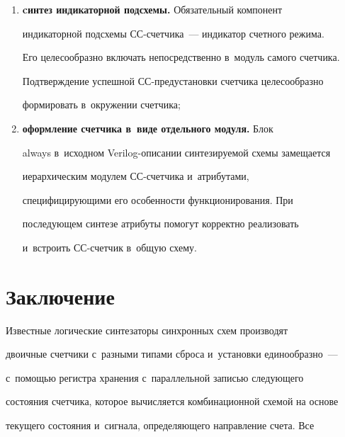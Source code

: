 \begin{enumerate}[(1)]
описывает сум\-ми\-ру\-ющий счетчик, пе\-ре\-клю\-ча\-ющий\-ся по переднему 

фронту сигнала~Т и~об\-ну\-ля\-ющий\-ся по сигналу $\mathrm{res}=1$,  

в~СС-ва\-ри\-ан\-те он реализуется на счетном триггере~С1С из 

биб\-лио\-те\-ки~[21], к~входу сброса которого подключается инверсия 

сигнала res;

\item \textbf{cинтез индикаторной подсхемы.} Обязательный компонент 

индикаторной подсхемы СС-счет\-чи\-ка~--- индикатор счетного режима. 

Его целесообразно включать непосредственно в~модуль самого счетчика. 

Под\-тверж\-де\-ние успешной СС-предуста\-нов\-ки счетчика целесообразно 

формировать в~окру\-же\-нии счетчика;

\item \textbf{оформление счетчика в~виде отдельного модуля.} Блок 

always в~исходном Verilog-опи\-са\-нии син\-те\-зи\-ру\-емой схемы замещается 

иерархическим модулем СС-счет\-чи\-ка и~атрибутами, 

спе\-ци\-фи\-ци\-ру\-ющи\-ми его особенности функционирования. При 

по\-сле\-ду\-ющем синтезе атрибуты помогут корректно реализовать 

и~встроить СС-счет\-чик в~общую схему.

\end{enumerate}



\section{Заключение}

  

  Известные логические синтезаторы синхронных схем производят 

двоичные счетчики с~разными типами сброса и~установки единообразно~--- 

с~по\-мощью ре\-гист\-ра хранения с~параллельной записью следующего 

со\-сто\-яния счетчика, которое вы\-чис\-ля\-ет\-ся комбинационной схемой на основе 

текущего со\-сто\-яния и~сигнала, опре\-де\-ля\-юще\-го на\-прав\-ле\-ние счета. Все 

